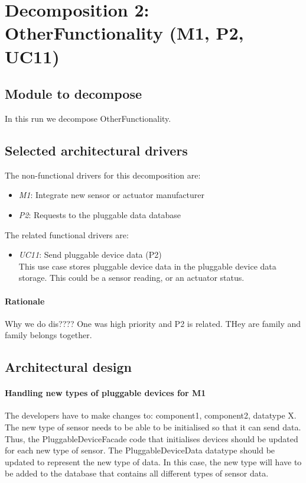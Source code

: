 \section{Decomposition 2: OtherFunctionality (M1, P2, UC11)}

\subsection{Module to decompose}
    In this run we decompose OtherFunctionality.


\subsection{Selected architectural drivers}
    The non-functional drivers for this decomposition are:
    \begin{itemize}
    	\item \emph{M1}: Integrate new sensor or actuator manufacturer
        \item \emph{P2}: Requests to the pluggable data database
    \end{itemize}

    \noindent The related functional drivers are:
    \begin{itemize}
        \item \emph{UC11}: Send pluggable device data (P2) \\
              This use case stores pluggable device data in the pluggable device data storage.
              This could be a sensor reading, or an actuator status.
    \end{itemize}

    \paragraph{Rationale}
        Why we do dis???? One was high priority and P2 is related. THey are family and family belongs together.


\subsection{Architectural design}

    \paragraph{Handling new types of pluggable devices for M1}
        The developers have to make changes to: component1, component2, datatype X.
        The new type of sensor needs to be able to be initialised so that it can send data.
        Thus, the PluggableDeviceFacade code that initialises devices should be updated for
        each new type of sensor. The PluggableDeviceData datatype should be updated to
        represent the new type of data. In this case, the new type will have to be added
        to the database that contains all different types of sensor data.

